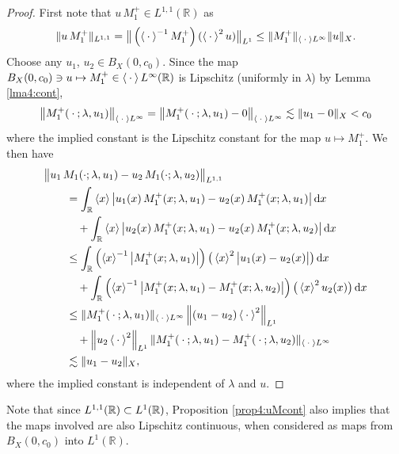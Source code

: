 \documentclass[../dissertation.tex]{subfiles}
\begin{document}
\begin{proof}
	First note that $u\, M_1^+ \in L^{1,1}(\mathbb R)$ as 
	\[
		\|u\, M_1^+\|_{L^{1,1}}
			= \big\| 
					\left(\left\langle \kern 0.5ex \cdot \kern 0.5ex \right\rangle^{-1} M_1^+\right) (\left\langle \kern 0.5ex \cdot \kern 0.5ex \right\rangle^2 u) 
				\big\|_{L^1} 
			\leq \|M_1^+\|_{\left\langle \kern 0.5ex \cdot \kern 0.5ex \right\rangle L^\infty} \|u\|_X.
	\]
	Choose any $u_1$, $u_2 \in B_X(0, c_0)$.
	Since the map 
	$B_X(0, c_0) \ni u \mapsto M_1^+ \in \left\langle \kern 0.5ex \cdot \kern 0.5ex \right\rangle L^\infty(\mathbb R)$ 
	is Lipschitz (uniformly in $\lambda$) by Lemma \ref{lma4:cont}, 
	\[
		\big\| M_1^+( \kern 0.5ex \cdot \kern 0.5ex; \lambda, u_1) \big\|_{\left\langle \kern 0.5ex \cdot \kern 0.5ex \right\rangle L^\infty}
			= 
				\big\| 
					M_1^+( \kern 0.5ex \cdot \kern 0.5ex; \lambda, u_1) - 0 
				\big\|_{\left\langle \kern 0.5ex \cdot \kern 0.5ex \right\rangle L^\infty}
			\lesssim \|u_1 - 0\|_{X}
			< c_0
	\]
	where the implied constant is the Lipschitz constant for the map 
	$u \mapsto M_1^+$. We then have
	\begin{align*}
		&\big\| 
			u_1\, M_1(\cdot; \lambda, u_1) - u_2\, M_1(\cdot; \lambda, u_2)
		\big\|_{L^{1,1}} \\
		&\qquad= 
			\int_{\mathbb R} 
				\left\langle x \right\rangle
				\big| 
					u_1(x) \, M_1^+( x; \lambda, u_1) 
						- u_2(x) \, M_1^+( x; \lambda, u_1) 
				\big| 
			\, \mathrm{d}x \\
		&\qquad\quad+
			\int_{\mathbb R} 
				\left\langle x \right\rangle
				\big|
					u_2(x) \, M_1^+( x; \lambda, u_1)  
						- u_2(x) \,  M_1^+( x; \lambda, u_2) 
				\big|
			\, \mathrm{d}x \\
		&\qquad\leq \int_{\mathbb R} 
				\left(\left\langle x \right\rangle^{-1}\big|M_1^+( x; \lambda, u_1)\big|\right)
				\big( \left\langle x \right\rangle^2
				\big| 
					u_1(x) - u_2(x)
				\big| 
				\big)
			\, \mathrm{d}x \\
		&\qquad\quad+
			\int_{\mathbb R} 
				\left(
					\left\langle x \right\rangle^{-1}
					\big|
						 M_1^+( x; \lambda, u_1)  
							-  M_1^+( x; \lambda, u_2) 
					\big|
				\right)
				\big( \left\langle x \right\rangle^2 u_2(x) \big)
			\, \mathrm{d}x \\
		&\qquad\leq 
			\|M_1^+( \kern 0.5ex \cdot \kern 0.5ex; \lambda, u_1) \|_{\left\langle \kern 0.5ex \cdot \kern 0.5ex \right\rangle L^\infty}
			\left\|(u_1 - u_2)\left\langle \kern 0.5ex \cdot \kern 0.5ex \right\rangle^2\right\|_{L^1} \\
		&\qquad\quad
			+ \left\|u_2\left\langle \kern 0.5ex \cdot \kern 0.5ex \right\rangle^2\right\|_{L^1}
				\|
					M_1^+( \kern 0.5ex \cdot \kern 0.5ex; \lambda, u_1)
					- M_1^+( \kern 0.5ex \cdot \kern 0.5ex; \lambda, u_2)
				\|_{\left\langle \kern 0.5ex \cdot \kern 0.5ex \right\rangle L^\infty} \\
		&\qquad\lesssim  \| u_1 - u_2 \|_X,
	\end{align*}
	where the implied constant is independent of $\lambda$ and $u$.
\end{proof}

\begin{rmk}
	Note that since $L^{1,1}(\mathbb R) \subset L^1(\mathbb R)$, Proposition 
	\ref{prop4:uMcont} also implies that the maps involved are also Lipschitz 
	continuous, when considered as maps from $B_X(0, c_0)$ into $L^1(\mathbb R)$.
\end{rmk}
\end{document}
